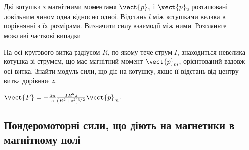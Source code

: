 \begin{problem}
    Дві котушки з магнітними моментами $\vect{p}_1$ і $\vect{p}_2$ розташовані довільним чином одна відносно одної. Відстань $l$ між котушками велика в порівнянні з їх розмірами. Визначити силу взаємодії між ними. Розгляньте можливі часткові випадки
\end{problem}

\begin{problem}
    На осі кругового витка радіусом $R$, по якому тече струм $I$, знаходиться невелика котушка зі струмом, що має магнітний момент $\vect{p}_m$, орієнтований вздовж осі витка. Знайти модуль сили, що діє на котушку, якщо її відстань від центру витка дорівнює $z$.
\begin{solution}
	$\vect{F} = -\frac{6\pi}{c}\frac{IR^2z}{(R^2 + z^2)^{5/2}}\vect{p}_m$.
\end{solution}
\end{problem}



%

\subsection*{Пондеромоторні сили, що діють на магнетики в магнітному полі}

